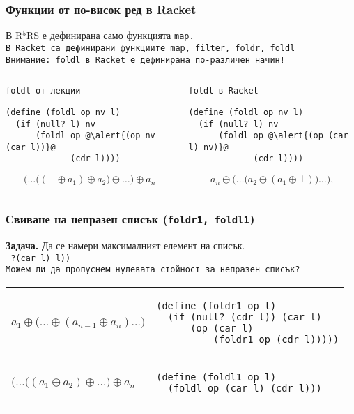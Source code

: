\documentclass{beamer}
\begin{document}
\begin{frame}[fragile]
  \frametitle{Функции от по-висок ред в Racket}

  В R$^5$RS е дефинирана само функцията \tt{map}.\\
  В Racket са дефинирани функциите \tt{map}, \tt{filter}, \tt{foldr}, \tt{foldl}\\[1em]
  \pause
  \alert{Внимание: \tt{foldl} в Racket е дефинирана по-различен начин!}\\[1em]
  \begin{columns}[T,onlytextwidth]
    \small
    \begin{column}{.5\textwidth}
      \tt{foldl} от лекции\\[1em]
\begin{lstlisting}
(define (foldl op nv l)
  (if (null? l) nv
      (foldl op @\alert{(op nv (car l))}@
             (cdr l))))
\end{lstlisting}
      \begin{equation*}
        \Big(\ldots\big((\bot \oplus a_1) \oplus a_2\big) \oplus \ldots\Big) \oplus a_n
      \end{equation*}
    \end{column}
    \begin{column}{.5\textwidth}
      \tt{foldl} в Racket\\[1em]
\begin{lstlisting}
(define (foldl op nv l)
  (if (null? l) nv
      (foldl op @\alert{(op (car l) nv)}@
             (cdr l))))
\end{lstlisting}
      \begin{equation*}
        a_n \oplus \Big(\ldots \big(a_2 \oplus (a_1 \oplus \bot)\big)\ldots\Big),
      \end{equation*}
    \end{column}
  \end{columns}
\end{frame}

\begin{frame}[fragile]
  \frametitle{Свиване на непразен списък (\tt{foldr1, foldl1})}

  \textbf{Задача.} Да се намери максималният елемент на списък.\\
  \pause
  \tt{ ?{(car l)} l))}\\[1em]
  \pause\pause
  Можем ли да пропуснем нулевата стойност за непразен списък?\\[1em]
  \begin{tabular}{ll}
    \pause
      $a_1 \oplus \big(\ldots \oplus (a_{n-1} \oplus a_n) \ldots\big)$
    & \pause
\begin{lstlisting}
(define (foldr1 op l)
  (if (null? (cdr l)) (car l)
      (op (car l)
          (foldr1 op (cdr l)))))
\end{lstlisting}\\[3em]
    \pause
    $\big(\ldots\big((a_1 \oplus a_2) \oplus \ldots\big) \oplus a_n$
    & \pause
\begin{lstlisting}
(define (foldl1 op l)
  (foldl op (car l) (cdr l)))
\end{lstlisting}
  \end{tabular}
\end{frame}
\end{document}
